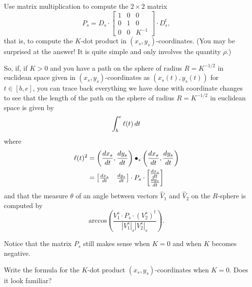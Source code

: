 \documentclass{ximera}
\begin{document}
\begin{problem}
\label{36}Use matrix multiplication to compute the $2\times2$ matrix%
\[
P_{s}=D_{s}\cdot
\begin{bmatrix}
1 & 0 & 0\\
0 & 1 & 0\\
0 & 0 & K^{-1}%
\end{bmatrix}\cdot D_{s}^{t},
\]
that is, to compute the $K$-dot product in $\left( x_{s},y_{s}\right)
$-coordinates. (You may be surprised at the answer! It is quite simple
and only involves the quantity $\rho$.)
\end{problem}

So, if, if $K>0$ and you have a path on the sphere of radius
$R=K^{-1/2}$ in euclidean space given in $\left( x_{s},y_{s}\right)
$-coordinates as $\left( x_{s}\left( t\right) ,y_{s}\left( t\right)
\right) $ for $t\in\left[ b,e\right] $, you can trace back everything
we have done with coordinate changes to see that the length of the
path on the sphere of radius $R=K^{-1/2}$ in euclidean space is given
by
\[
\int_b^e\ell(t)\,d t
\]
where%
\begin{align*}
\l(t)^{2} &=\left(  \frac{dx_{s}}{dt},\frac{dy_{s}}%
{dt}\right)  \bullet_{s}\left(  \frac{dx_{s}}{dt},\frac{dy_{s}}{dt}\right) \\
&=
\begin{bmatrix}
\frac{dx_{s}}{dt} & \frac{dy_{s}}{dt}%
\end{bmatrix}
\cdot P_{s}\cdot
\begin{bmatrix}
\frac{dx_{s}}{dt}\\
\frac{dy_{s}}{dt}%
\end{bmatrix}
\end{align*}
and that the measure $\theta$ of an angle between vectors $\hat{V}_{1}$ and
$\hat{V}_{2}$ on the $R$-sphere is computed by%
\[
\mathrm{arccos}\left(  \frac{V_{1}^{s}\cdot P_{s}\cdot\left(  V_{2}%
^{s}\right)  ^{t}}{\left\vert V_{1}^{s}\right\vert _{s}\left\vert V_{2}%
^{s}\right\vert _{s}}\right)  .
\]


Notice that the matrix $P_{s}$ still makes sense when $K=0$ and when
$K$ becomes negative.

\begin{problem}
Write the formula for the $K$-dot product $\left(  x_{s},y_{s}\right)
$-coordinates when $K=0$. Does it look familiar?
\end{problem}
\end{document}
